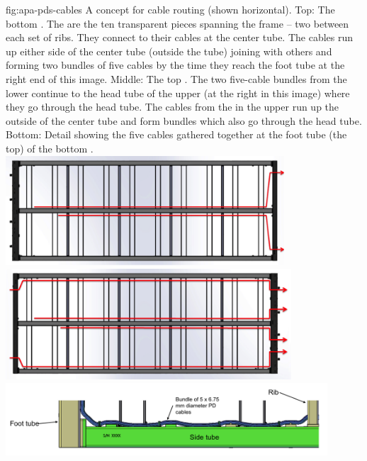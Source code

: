 \begin{dunefigure}{fig:apa-pds-cables}
{A concept for  cable routing (shown horizontal). Top: The bottom .  The  are the ten transparent pieces spanning the frame -- two between each set of ribs.  They connect to their cables at the center tube.  The cables run up either side of the center tube (outside the tube) joining with others and forming two bundles of five cables by the time they reach the foot tube at the right end of this image. Middle: The top . The two five-cable bundles from the lower  continue to the head tube of the upper  (at the right in this image) where they go through the head tube.  The cables from the  in the upper  run up the outside of the center tube and form bundles which also go through the head tube. Bottom: Detail showing the five  cables gathered together at the foot tube (the top) of the bottom .}
\includegraphics[width=0.78\textwidth]{graphics/sp-apa-pds-cables-bottom.png}
\hspace*{4mm}\includegraphics[width=0.8\textwidth]{graphics/sp-apa-pds-cables-top.png}
\vspace{5mm} \\
\hspace*{-10mm}\includegraphics[width=0.9\textwidth]{graphics/sp-apa-pds-cables-detail.png}
\end{dunefigure}





